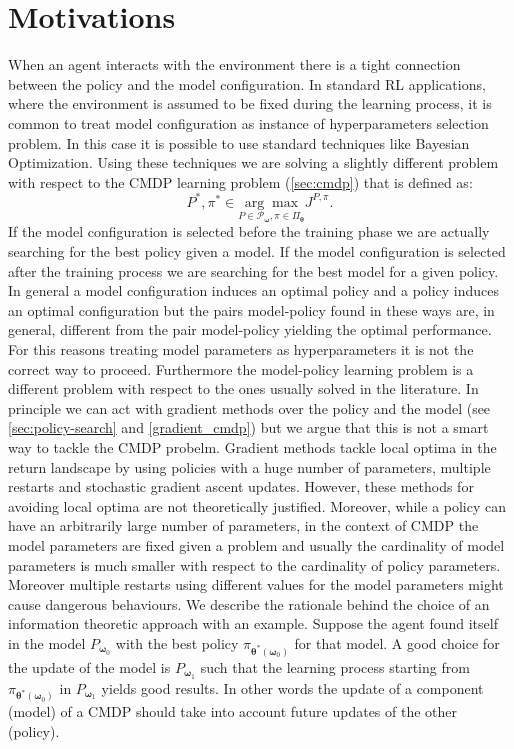 \section{Motivations}
When an agent interacts with the environment there is a tight connection between the policy and the model configuration. In standard RL applications, where the environment is assumed to be fixed during the learning process, it is common to treat model configuration as instance of hyperparameters selection problem. In this case it is possible to use standard techniques like Bayesian Optimization. Using these techniques we are solving a slightly different problem with respect to the CMDP learning problem (\cref{sec:cmdp}) that is defined as:
$$
P^*,\pi^* \in \underset{P \in \mathcal{P}_{\boldsymbol{\omega}}, \pi \in \Pi_{\boldsymbol{\theta}}}{\arg \max}J^{P,\pi}.
$$
If the model configuration is selected before the training phase we are actually searching for the best policy given a model. If the model configuration is selected after the training process we are searching for the best model for a given policy.
In general a model configuration induces an optimal policy and a policy induces an optimal configuration but the pairs model-policy found in these ways are, in general, different from the pair model-policy yielding the optimal performance. For this reasons treating model parameters as hyperparameters it is not the correct way to proceed. Furthermore the model-policy learning problem is a different problem with respect to the ones usually solved in the literature.
\newline
In principle we can act with gradient methods over the policy and the model (see \cref{sec:policy-search} and \cref{gradient_cmdp}) but we argue that this is not a smart way to tackle the CMDP probelm. Gradient methods tackle local optima in the return landscape by using policies with a huge number of parameters, multiple restarts and stochastic gradient ascent updates. However, these methods for avoiding local optima are not theoretically justified. Moreover, while a policy can have an arbitrarily large number of parameters, in the context of CMDP the model parameters are fixed given a problem and usually the cardinality of model parameters is much smaller with respect to the cardinality of policy parameters. Moreover multiple restarts using different values for the model parameters might cause dangerous behaviours. \newline
We describe the rationale behind the choice of an information theoretic approach with an example.
Suppose the agent found itself in the model $P_{\bm{\omega}_0}$ with the best policy $\pi_{\bm{\theta}^*(\bm{\omega}_0)}$ for that model. A good choice for the update of the model is $P_{\bm{\omega}_1}$ such that the learning process starting from $\pi_{\bm{\theta}^*(\bm{\omega}_0)}$ in $P_{\bm{\omega}_1}$ yields good results. In other words the update of a component (model) of a CMDP should take into account future updates of the other (policy). 
